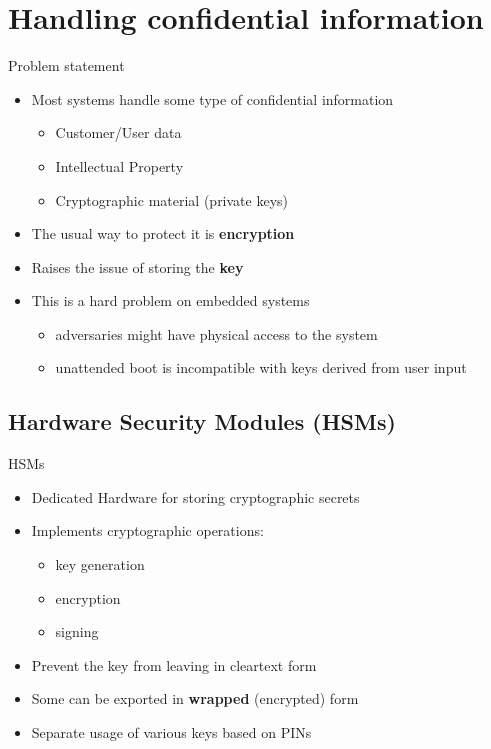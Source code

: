 \section{Handling confidential information}

\begin{frame}{Problem statement}
  \begin{itemize}
    \item Most systems handle some type of confidential information
    \begin{itemize}
      \item Customer/User data
      \item Intellectual Property
      \item Cryptographic material (private keys)
    \end{itemize}
    \item The usual way to protect it is \textbf{encryption}
    \item Raises the issue of storing the \textbf{key}
    \item This is a hard problem on embedded systems
    \begin{itemize}
      \item adversaries might have physical access to the system
      \item unattended boot is incompatible with keys derived from user input
    \end{itemize}
  \end{itemize}
\end{frame}

\subsection{Hardware Security Modules (HSMs)}

\begin{frame}{HSMs}
  \begin{itemize}
    \item Dedicated Hardware for storing cryptographic secrets
    \item Implements cryptographic operations:
    \begin{itemize}
      \item key generation
      \item encryption
      \item signing
    \end{itemize}
    \item Prevent the key from leaving in cleartext form
    \item Some can be exported in \textbf{wrapped} (encrypted) form
    \item Separate usage of various keys based on PINs
  \end{itemize}
\end{frame}

